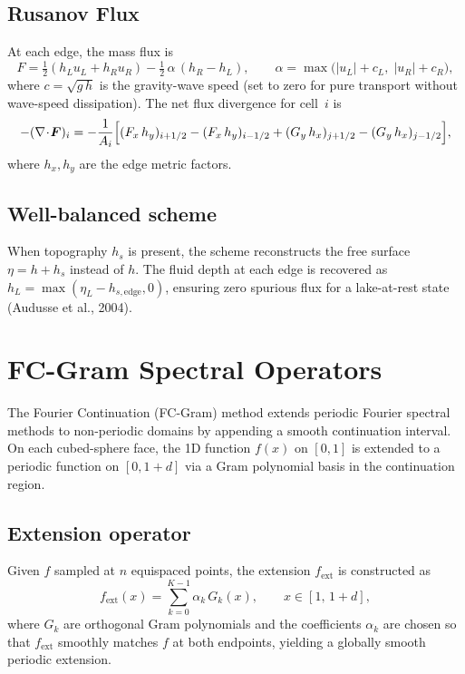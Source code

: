 \documentclass[11pt,a4paper]{article}
\newcommand{\half}{\tfrac{1}{2}}
\begin{document}
\subsection{Rusanov Flux}

At each edge, the mass flux is
\begin{equation}
  F = \half(h_L u_L + h_R u_R) - \half\,\alpha\,(h_R-h_L),
  \qquad \alpha=\max\!\bigl(|u_L|+c_L,\;|u_R|+c_R\bigr),
\end{equation}
where $c=\sqrt{g\,h}$ is the gravity-wave speed (set to zero for pure transport without wave-speed dissipation).  The net flux divergence for cell~$i$ is
\begin{equation}
  -(\nabla\!\cdot\!\bm F)_i = -\frac{1}{A_i}\Bigl[(F_x\,h_y)_{i+1/2}-(F_x\,h_y)_{i-1/2}+(G_y\,h_x)_{j+1/2}-(G_y\,h_x)_{j-1/2}\Bigr],
\end{equation}
where $h_x,h_y$ are the edge metric factors.

\subsection{Well-balanced scheme}
When topography $h_s$ is present, the scheme reconstructs the free surface $\eta=h+h_s$ instead of $h$.  The fluid depth at each edge is recovered as $h_L=\max(\eta_L-h_{s,\mathrm{edge}},0)$, ensuring zero spurious flux for a lake-at-rest state (Audusse et al., 2004).

\section{FC-Gram Spectral Operators}

The Fourier Continuation (FC-Gram) method extends periodic Fourier spectral methods to non-periodic domains by appending a smooth continuation interval.  On each cubed-sphere face, the 1D function $f(x)$ on $[0,1]$ is extended to a periodic function on $[0,1+d]$ via a Gram polynomial basis in the continuation region.

\subsection{Extension operator}
Given $f$ sampled at $n$ equispaced points, the extension $f_{\mathrm{ext}}$ is constructed as
\begin{equation}
  f_{\mathrm{ext}}(x) = \sum_{k=0}^{K-1}\alpha_k\,G_k(x), \qquad x\in[1,\,1+d],
\end{equation}
where $G_k$ are orthogonal Gram polynomials and the coefficients $\alpha_k$ are chosen so that $f_{\mathrm{ext}}$ smoothly matches $f$ at both endpoints, yielding a globally smooth periodic extension.
\end{document}

